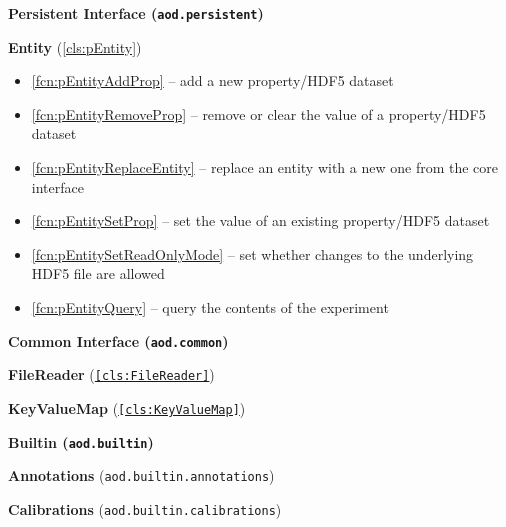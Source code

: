\documentclass{aodatadocs}
\newcommand{\mclass}[1]{\textcolor{blue}{\texttt{#1}}}
\begin{document}
{\begin{legal}[font=\Large\bfseries, itemsep=1.5ex]
\begin{legal}[font=\large\bfseries, itemsep=1ex]
    \end{legal}
    \item {\Large\bfseries Persistent Interface (\texttt{aod.persistent})}
    \begin{legal}[font=\large\bfseries, itemsep=1ex]
        \item {\large\textbf{Entity} (\ref{cls:pEntity})}
        \begin{itemize}
            \item \ref{fcn:pEntityAddProp} -- add a new property/HDF5 dataset
            \item \ref{fcn:pEntityRemoveProp} -- remove or clear the value of a property/HDF5 dataset 
            \item \ref{fcn:pEntityReplaceEntity} -- replace an entity with a new one from the core interface
            \item \ref{fcn:pEntitySetProp} -- set the value of an existing property/HDF5 dataset 
            \item \ref{fcn:pEntitySetReadOnlyMode} -- set whether changes to the underlying HDF5 file are allowed
            \item \ref{fcn:pEntityQuery} -- query the contents of the experiment
        \end{itemize}
    \end{legal}
    \item {\Large\bfseries Common Interface (\texttt{aod.common})}
    \begin{legal}[font=\large\bfseries, itemsep=1ex]
        \item {\large\textbf{FileReader} (\texttt{\ref{cls:FileReader}})}
        \item {\large\textbf{KeyValueMap} (\texttt{\ref{cls:KeyValueMap}})}
    \end{legal}
    \item {\Large\bfseries Builtin (\texttt{aod.builtin})}
    \begin{legal}[font=\large\bfseries, itemsep=1ex]
        \item {\large\textbf{Annotations} (\texttt{aod.builtin.annotations})}
        \item {\large\textbf{Calibrations} (\texttt{aod.builtin.calibrations})}

\end{legal}
\end{legal}}
\end{document}
